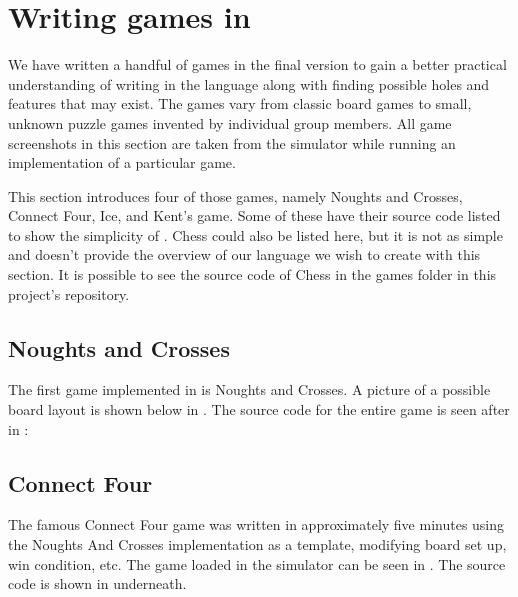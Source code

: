 \section{Writing games in \productname{}}
\label{sec:writinggames}
We have written a handful of games in the final version \productname{}
to gain a better practical understanding of writing in the language
along with finding possible holes and features that may exist. The games
vary from classic board games to small, unknown puzzle games invented by
individual group members. All game screenshots in this section are taken
from the simulator while running an implementation of a particular game.

This section introduces four of those games, namely Noughts and Crosses,
Connect Four, Ice, and Kent's game. Some of these have their source code
listed to show the simplicity of \productname{}. Chess could also be
listed here, but it is not as simple and doesn't provide the overview
of our language we wish to create with this section. It is possible
to see the source code of Chess in the games folder in this project's
repository.

\subsection{Noughts and Crosses}
The first game implemented in \productname{} is Noughts and
Crosses. A picture of a possible board layout is shown below in
. The source code for the entire game is seen
after in :



\subsection{Connect Four}
The famous Connect Four game was written in approximately five minutes
using the Noughts And Crosses implementation as a template, modifying
board set up, win condition, etc. The game loaded in the simulator can
be seen in . The source code is shown in
 underneath.



